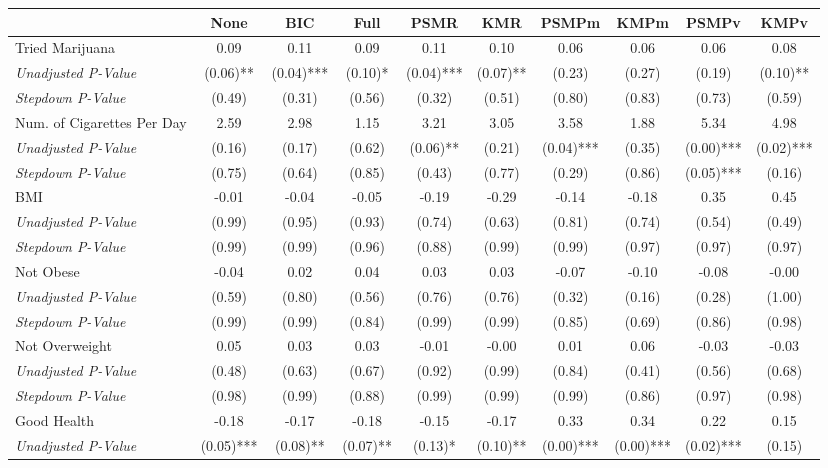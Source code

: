\begin{tabular}{l c c c c c c c c c}
\toprule
 & None & BIC & Full & PSMR & KMR & PSMPm & KMPm & PSMPv & KMPv \\
\midrule
Tried Marijuana & 0.09 & 0.11 & 0.09 & 0.11 & 0.10 & 0.06 & 0.06 & 0.06 & 0.08 \\
\quad \textit{Unadjusted P-Value} & (0.06)** & (0.04)*** & (0.10)* & (0.04)*** & (0.07)** & (0.23) & (0.27) & (0.19) & (0.10)** \\
\quad \textit{Stepdown P-Value} & (0.49) & (0.31) & (0.56) & (0.32) & (0.51) & (0.80) & (0.83) & (0.73) & (0.59) \\
Num. of Cigarettes Per Day & 2.59 & 2.98 & 1.15 & 3.21 & 3.05 & 3.58 & 1.88 & 5.34 & 4.98 \\
\quad \textit{Unadjusted P-Value} & (0.16) & (0.17) & (0.62) & (0.06)** & (0.21) & (0.04)*** & (0.35) & (0.00)*** & (0.02)*** \\
\quad \textit{Stepdown P-Value} & (0.75) & (0.64) & (0.85) & (0.43) & (0.77) & (0.29) & (0.86) & (0.05)*** & (0.16) \\
BMI & -0.01 & -0.04 & -0.05 & -0.19 & -0.29 & -0.14 & -0.18 & 0.35 & 0.45 \\
\quad \textit{Unadjusted P-Value} & (0.99) & (0.95) & (0.93) & (0.74) & (0.63) & (0.81) & (0.74) & (0.54) & (0.49) \\
\quad \textit{Stepdown P-Value} & (0.99) & (0.99) & (0.96) & (0.88) & (0.99) & (0.99) & (0.97) & (0.97) & (0.97) \\
Not Obese & -0.04 & 0.02 & 0.04 & 0.03 & 0.03 & -0.07 & -0.10 & -0.08 & -0.00 \\
\quad \textit{Unadjusted P-Value} & (0.59) & (0.80) & (0.56) & (0.76) & (0.76) & (0.32) & (0.16) & (0.28) & (1.00) \\
\quad \textit{Stepdown P-Value} & (0.99) & (0.99) & (0.84) & (0.99) & (0.99) & (0.85) & (0.69) & (0.86) & (0.98) \\
Not Overweight & 0.05 & 0.03 & 0.03 & -0.01 & -0.00 & 0.01 & 0.06 & -0.03 & -0.03 \\
\quad \textit{Unadjusted P-Value} & (0.48) & (0.63) & (0.67) & (0.92) & (0.99) & (0.84) & (0.41) & (0.56) & (0.68) \\
\quad \textit{Stepdown P-Value} & (0.98) & (0.99) & (0.88) & (0.99) & (0.99) & (0.99) & (0.86) & (0.97) & (0.98) \\
Good Health & -0.18 & -0.17 & -0.18 & -0.15 & -0.17 & 0.33 & 0.34 & 0.22 & 0.15 \\
\quad \textit{Unadjusted P-Value} & (0.05)*** & (0.08)** & (0.07)** & (0.13)* & (0.10)** & (0.00)*** & (0.00)*** & (0.02)*** & (0.15) \\

\end{tabular}

